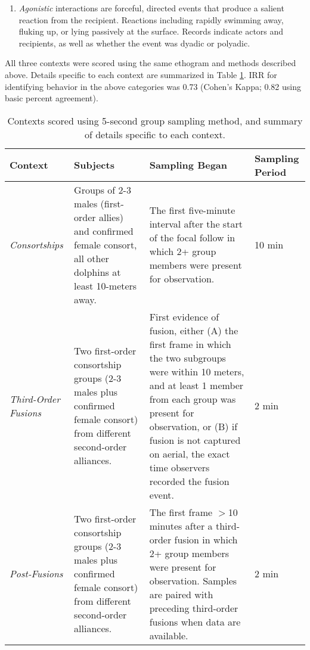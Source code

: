 \documentclass[11pt]{amsart}
\begin{document}
\begin{enumerate}
\item{\emph{Agonistic}} interactions are forceful, directed events that produce a salient reaction from the recipient. Reactions including rapidly swimming away, fluking up, or lying passively at the surface. Records indicate actors and recipients, as well as whether the event was dyadic or polyadic. 
\end{enumerate}

All three contexts were scored using the same ethogram and methods described above. Details specific to each context are summarized in Table \ref{table:contexts}. IRR for identifying behavior in the above categories was 0.73 (Cohen's Kappa; 0.82 using basic percent agreement).

\begin{table}
\begin{tabular}{| p{2cm} | p{5cm} | p{5cm} | p{2.6cm}|}
\hline
Context & Subjects & Sampling Began & Sampling Period 
\\ \hline
\emph{Consortships}
& Groups of 2-3 males (first-order allies) and confirmed female consort, all other dolphins at least 10-meters away. 
& The first five-minute interval after the start of the focal follow in which 2+ group members were present for observation.
& 10 min
\\ \hline
\emph{Third-Order Fusions}
& Two first-order consortship groups (2-3 males plus confirmed female consort) from different second-order alliances.
& First evidence of fusion, either (A) the first frame in which the two subgroups were within 10 meters, and at least 1 member from each group was present for observation, or (B) if fusion is not captured on aerial, the exact time observers recorded the fusion event.
& 2 min
\\ \hline
\emph{Post-Fusions}
& Two first-order consortship groups (2-3 males plus confirmed female consort) from different second-order alliances.
& The first frame $>$10 minutes after a third-order fusion in which 2+ group members were present for observation. Samples are paired with preceding third-order fusions when data are available.
& 2 min
\\\hline
\end{tabular}
\caption{Contexts scored using 5-second group sampling method, and summary of details specific to each context.}
\label{table:contexts}
\end{table}
\end{document}
